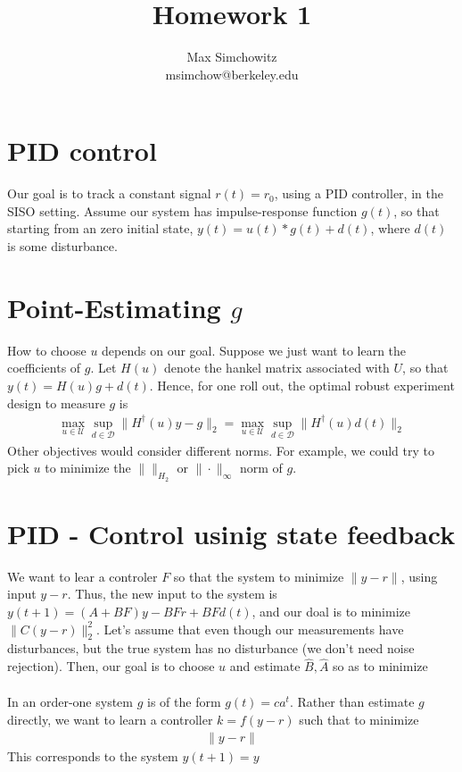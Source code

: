 \documentclass[11pt]{article} %
\title{Homework 1}
\author{Max Simchowitz\\
msimchow@berkeley.edu}
\newcommand{\calD}{\mathcal{D}}
\newcommand{\calU}{\mathcal{U}}
\theoremstyle{plain}
\theoremstyle{definition}
\theoremstyle{remark}
\begin{document}
\section{PID control}
Our goal is to track a constant signal $r(t) = r_0$, using a PID controller, in the SISO setting. Assume our system has impulse-response function $g(t)$, so that starting from an zero initial state, $y(t) = u(t)*g(t) + d(t)$, where $d(t)$ is some disturbance. 

\section{Point-Estimating $g$}
How to choose $u$ depends on our goal. Suppose we just want to learn the coefficients of $g$. Let $H(u)$ denote the hankel matrix associated with $U$, so that $y(t) = H(u)g + d(t)$. Hence, for one roll out, the optimal robust experiment design to measure $g$ is 
\begin{eqnarray}
\max_{u \in \calU} \sup_{d \in \calD}\|H^{\dagger}(u)y - g\|_2 = \max_{u \in \calU} \sup_{d \in \calD}\|H^{\dagger}(u)d(t)\|_2
\end{eqnarray}
Other objectives would consider different norms. For example, we could try to pick $u$ to minimize the $\|\|_{H_2}$ or $\|\cdot\|_{\infty}$ norm of $g$.
\section{PID - Control usinig state feedback}

We want to lear a controler $F$ so that the system to minimize $\|y - r\|$, using input $y - r$. Thus, the new input to the system is $y(t+1) = (A+BF)y - BFr + BFd(t)$, and our doal is to minimize $\|C(y - r)\|_2^2$. Let's assume that even though our measurements have disturbances, but the true system has no disturbance (we don't need noise rejection). Then, our goal is to choose $u$ and estimate $\hat{B},\hat{A}$ so as to minimize
\begin{eqnarray}
\end{eqnarray}









In an order-one system $g$ is of the form $g(t) = ca^t$. Rather than estimate $g$ directly, we want to learn a controller $k = f(y -r)$ such that to minimize
\begin{eqnarray}
\|y-r\|
\end{eqnarray}
This corresponds to the system $y(t+1) = y$
\end{document}
